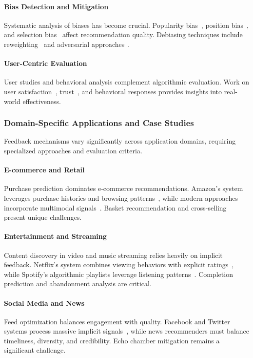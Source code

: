 \paragraph{Bias Detection and Mitigation}
Systematic analysis of biases has become crucial. Popularity bias~\cite{abdollahpouri2019unfairness}, position bias~\cite{wang2021user}, and selection bias~\cite{schnabel2016recommendations} affect recommendation quality. Debiasing techniques include reweighting~\cite{wang2021user} and adversarial approaches~\cite{zehlike2020reducing}.

\paragraph{User-Centric Evaluation}
User studies and behavioral analysis complement algorithmic evaluation. Work on user satisfaction~\cite{knijnenburg2012explaining}, trust~\cite{pu2011user}, and behavioral responses provides insights into real-world effectiveness.

\subsubsection{Domain-Specific Applications and Case Studies}

Feedback mechanisms vary significantly across application domains, requiring specialized approaches and evaluation criteria.

\paragraph{E-commerce and Retail}
Purchase prediction dominates e-commerce recommendations. Amazon's system leverages purchase histories and browsing patterns~\cite{linden2003amazon}, while modern approaches incorporate multimodal signals~\cite{covington2016deep}. Basket recommendation and cross-selling present unique challenges.

\paragraph{Entertainment and Streaming}
Content discovery in video and music streaming relies heavily on implicit feedback. Netflix's system combines viewing behaviors with explicit ratings~\cite{gomez2015netflix}, while Spotify's algorithmic playlists leverage listening patterns~\cite{van2013deep}. Completion prediction and abandonment analysis are critical.

\paragraph{Social Media and News}
Feed optimization balances engagement with quality. Facebook and Twitter systems process massive implicit signals~\cite{wu2020mind}, while news recommenders must balance timeliness, diversity, and credibility. Echo chamber mitigation remains a significant challenge.

